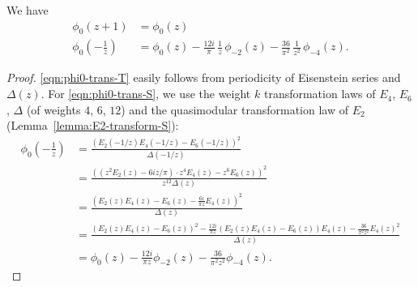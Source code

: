 \begin{lemma}\label{lemma:phi0-transform}\leanok
We have
\begin{align}
    \phi_0(z + 1) &= \phi_0(z) \label{eqn:phi0-trans-T} \\
    \phi_0\left(-\frac{1}{z}\right) &= \phi_0(z)-\frac{12i}{\pi}\,\frac{1}{z}\,\phi_{-2}(z)-\frac{36}{\pi^2}\,\frac{1}{z^2}\,\phi_{-4}(z).\label{eqn:phi0-trans-S}
\end{align}
\end{lemma}
\begin{proof}\leanok
\eqref{eqn:phi0-trans-T} easily follows from periodicity of Eisenstein series and $\Delta(z)$.
For \eqref{eqn:phi0-trans-S}, we use the weight $k$ transformation laws of $E_4$, $E_6$, $\Delta$ (of weights $4$, $6$, $12$) and the quasimodular transformation law of $E_2$ (Lemma~\ref{lemma:E2-transform-S}):
\begin{align}
    \phi_{0}\left(-\frac{1}{z}\right) &= \frac{(E_2(-1/z) E_4(-1/z) - E_6(-1/z))^{2}}{\Delta(-1/z)} \\
    &= \frac{((z^2 E_2(z) - 6iz / \pi) \cdot z^4 E_4(z) - z^6 E_6(z))^{2}}{z^{12} \Delta(z)} \\
    &= \frac{\left(E_2(z) E_4(z) - E_6(z) - \frac{6i}{\pi z} E_4(z)\right)^2}{\Delta(z)} \\
    &= \frac{(E_2(z) E_4(z) - E_6(z))^{2} - \frac{12i}{\pi z}(E_2(z) E_4(z) - E_6(z)) E_4(z) - \frac{36}{\pi^2 z^2} E_4(z)^{2}}{\Delta(z)} \\
    &= \phi_0(z) - \frac{12 i}{\pi z} \phi_{-2}(z) - \frac{36}{\pi^2 z^2} \phi_{-4}(z).
\end{align}
\end{proof}

